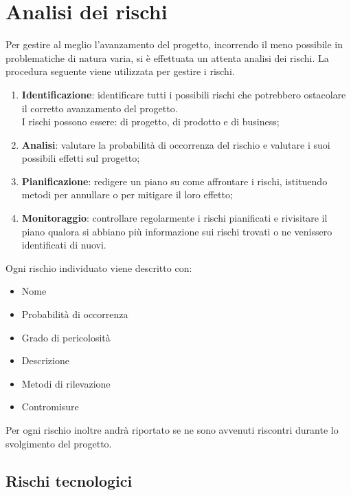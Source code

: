 \section{Analisi dei rischi} %
\label{sec:analisi_dei_rischi}
Per gestire al meglio l'avanzamento del progetto, incorrendo il meno possibile in problematiche di natura varia, si è effettuata un attenta analisi dei rischi. La procedura seguente viene utilizzata per gestire i rischi.
	\begin{enumerate}
		\item \textbf{Identificazione}: identificare tutti i possibili rischi che potrebbero ostacolare il corretto avanzamento del progetto. \\
		I rischi possono essere: di progetto, di prodotto e di business;
		\item \textbf{Analisi}: valutare la probabilità di occorrenza del rischio e valutare i suoi possibili effetti sul progetto;
		\item \textbf{Pianificazione}: redigere un piano su come affrontare i rischi, istituendo metodi per annullare o per mitigare il loro effetto;
		\item \textbf{Monitoraggio}: controllare regolarmente i rischi pianificati e rivisitare il piano qualora si abbiano più informazione sui rischi trovati o ne venissero identificati di nuovi.
	\end{enumerate}
\noindent
Ogni rischio individuato viene descritto con: 
	\begin{itemize}
		\item Nome
		\item Probabilità di occorrenza
		\item Grado di pericolosità
		\item Descrizione
		\item Metodi di rilevazione
		\item Contromisure
	\end{itemize}
\noindent
Per ogni rischio inoltre andrà riportato se ne sono avvenuti riscontri durante lo svolgimento del progetto.

	\subsection{Rischi tecnologici} %
	\label{sub:rischi_tecnologici}
